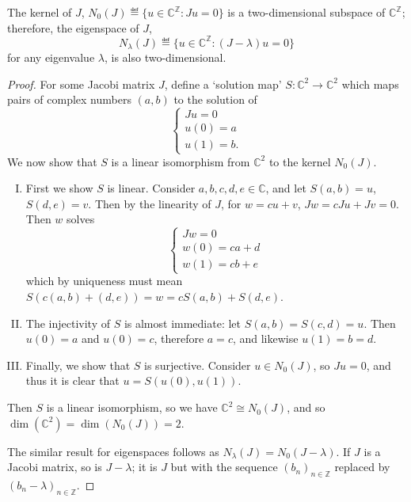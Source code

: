 \documentclass[../main.tex]{subfiles}
\begin{document}
\begin{proposition}
\label{thm:2efde-ker-dim}
  The kernel of $J$, $N_0(J) \eqdef \{u \in \mathbb{C}^\mathbb{Z} : Ju = 0\}$
  is a two-dimensional subspace of $\mathbb{C}^\mathbb{Z}$;
  therefore, the eigenspace of $J$, 
$$N_\lambda(J) \eqdef \{u \in \mathbb{C}^\mathbb{Z} : (J - \lambda)u = 0\}$$
for any eigenvalue $\lambda$, is also two-dimensional.
\end{proposition}
\begin{proof}
For some Jacobi matrix $J$, define a `solution map' 
$S: \mathbb{C}^2 \rightarrow \mathbb{C}^2$ which maps pairs of
complex numbers $(a, b)$ to the solution of 
  $$
  \begin{cases} 
    Ju = 0\\
    u(0) = a\\ u(1) = b.
  \end{cases}
  $$
We now show that $S$ is a linear
isomorphism from $\mathbb{C}^2$ to the kernel $N_0 (J)$.
\begin{enumerate}[I.]
\item First we show $S$ is linear. Consider $a, b, c, d, e \in
\mathbb{C}$, and let $S(a, b) = u$, $S(d, e) = v$. Then by the
linearity of $J$, for $w = cu + v$, $Jw = cJu + Jv = 0$. Then
$w$ solves
  $$ 
  \begin{cases}
    Jw = 0\\
    w(0) = ca + d\\
    w(1) = cb + e 
  \end{cases}
  $$
which by uniqueness must mean $S(c(a, b) + (d, e)) = w = cS(a, b) + S(d, e)$.

\item The injectivity of $S$ is almost immediate: let $S(a, b) = S(c, d) = u$.
Then $u(0) = a$ and $u(0) = c$, therefore $a = c$, and likewise $u(1) = b = d$.

\item Finally, we show that $S$ is surjective. Consider $u \in N_0 (J)$, so $Ju
= 0$, and thus it is clear that $u = S(u(0), u(1)).$ \end{enumerate} Then $S$ is
a linear isomorphism, so we have $\mathbb{C}^2 \cong N_0 (J)$, and so
$\dim(\mathbb{C}^2) = \dim(N_0 (J)) = 2$.

The similar result for eigenspaces follows as
$N_\lambda (J) = N_0 (J - \lambda)$. If $J$ is a Jacobi matrix, so is $J - \lambda$;
it is $J$ but with the sequence $(b_n)_{n \in \mathbb{Z}}$ replaced by $(b_n - \lambda)_{n \in
\mathbb{Z}}$. 
\end{proof}
\end{document}
